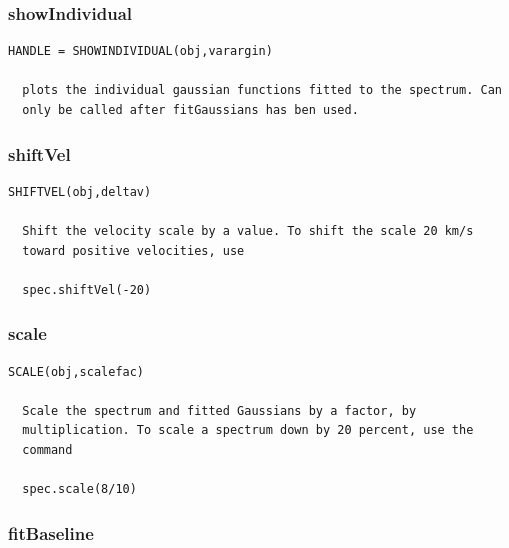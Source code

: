 \documentclass[11pt,a4paper]{article}
\begin{document}
\subsubsection*{showIndividual}
\label{sec:showindividual}

\begin{lstlisting}[framerule=0pt]
  HANDLE = SHOWINDIVIDUAL(obj,varargin)
  
  plots the individual gaussian functions fitted to the spectrum. Can
  only be called after fitGaussians has ben used.            
\end{lstlisting}

\subsubsection*{shiftVel}
\label{sec:shiftvel}

\begin{lstlisting}[framerule=0pt]
  SHIFTVEL(obj,deltav)
  
  Shift the velocity scale by a value. To shift the scale 20 km/s
  toward positive velocities, use
  
  spec.shiftVel(-20)
\end{lstlisting}

\subsubsection*{scale}
\label{sec:scale}

\begin{lstlisting}[framerule=0pt]
  SCALE(obj,scalefac)
  
  Scale the spectrum and fitted Gaussians by a factor, by
  multiplication. To scale a spectrum down by 20 percent, use the
  command
  
  spec.scale(8/10)
\end{lstlisting}

\subsubsection*{fitBaseline}
\label{sec:fitbaseline}
\end{document}

